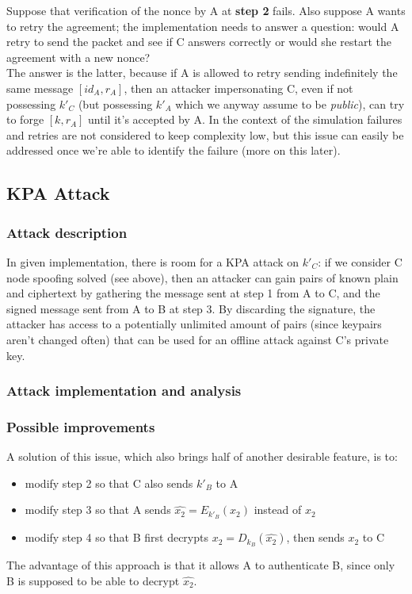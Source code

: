 \documentclass[a4paper,12pt,titlepage]{article}
\begin{document}
Suppose that verification of the nonce by A at \textbf{step 2} fails. Also
suppose A wants to retry the agreement; the implementation needs to answer a
question: would A retry to send the packet and see if C answers correctly or
would she restart the agreement with a new nonce? \\
The answer is the latter, because if A is allowed to retry sending indefinitely
the same message $[id_A, r_A]$, then an attacker impersonating C, even if not
possessing $k'_C$ (but possessing $k'_A$ which we anyway assume to be
\emph{public}), can try to forge $[k, r_A]$ until it's accepted by A.
In the context of the simulation failures and retries are not considered to
keep complexity low, but this issue can easily be addressed once we're able to
identify the failure (more on this later).

\subsection{KPA Attack}
\subsubsection*{Attack description}
In given implementation, there is room for a KPA attack on $k'_C$: if we
consider C node spoofing solved (see above), then an attacker can
gain pairs of known plain and ciphertext by gathering the message sent at step
1 from A to C, and the signed message sent from A to B at step 3. By discarding
the signature, the attacker has access to a potentially unlimited amount of
pairs (since keypairs aren't changed often) that can be used for an offline
attack against C's private key.

\subsubsection*{Attack implementation and analysis}

\subsubsection*{Possible improvements}
A solution of this issue, which also brings half of another desirable feature,
is to:
\begin{itemize}
  \item modify step 2 so that C also sends $k'_B$ to A
  \item modify step 3 so that A sends $\hat{x_2} = E_{k'_B}(x_2)$ instead of $x_2$
  \item modify step 4 so that B first decrypts $x_2 = D_{k_B}(\hat{x_2})$, then
  sends $x_2$ to C
\end{itemize}
The advantage of this approach is that it allows A to authenticate B, since
only B is supposed to be able to decrypt $\hat{x_2}$.
\end{document}
